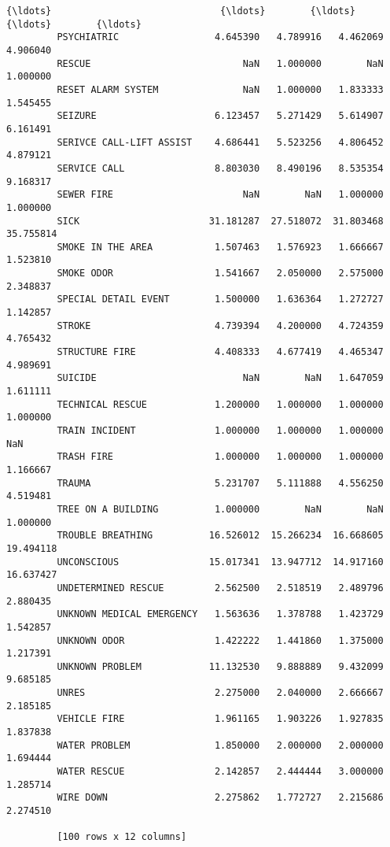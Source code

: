 \documentclass[11pt]{article}
\begin{document}
\begin{Verbatim}[commandchars=\\\{\}]
         {\ldots}                              {\ldots}        {\ldots}        {\ldots}        {\ldots}  
         PSYCHIATRIC                 4.645390   4.789916   4.462069   4.906040  
         RESCUE                           NaN   1.000000        NaN   1.000000  
         RESET ALARM SYSTEM               NaN   1.000000   1.833333   1.545455  
         SEIZURE                     6.123457   5.271429   5.614907   6.161491  
         SERIVCE CALL-LIFT ASSIST    4.686441   5.523256   4.806452   4.879121  
         SERVICE CALL                8.803030   8.490196   8.535354   9.168317  
         SEWER FIRE                       NaN        NaN   1.000000   1.000000  
         SICK                       31.181287  27.518072  31.803468  35.755814  
         SMOKE IN THE AREA           1.507463   1.576923   1.666667   1.523810  
         SMOKE ODOR                  1.541667   2.050000   2.575000   2.348837  
         SPECIAL DETAIL EVENT        1.500000   1.636364   1.272727   1.142857  
         STROKE                      4.739394   4.200000   4.724359   4.765432  
         STRUCTURE FIRE              4.408333   4.677419   4.465347   4.989691  
         SUICIDE                          NaN        NaN   1.647059   1.611111  
         TECHNICAL RESCUE            1.200000   1.000000   1.000000   1.000000  
         TRAIN INCIDENT              1.000000   1.000000   1.000000        NaN  
         TRASH FIRE                  1.000000   1.000000   1.000000   1.166667  
         TRAUMA                      5.231707   5.111888   4.556250   4.519481  
         TREE ON A BUILDING          1.000000        NaN        NaN   1.000000  
         TROUBLE BREATHING          16.526012  15.266234  16.668605  19.494118  
         UNCONSCIOUS                15.017341  13.947712  14.917160  16.637427  
         UNDETERMINED RESCUE         2.562500   2.518519   2.489796   2.880435  
         UNKNOWN MEDICAL EMERGENCY   1.563636   1.378788   1.423729   1.542857  
         UNKNOWN ODOR                1.422222   1.441860   1.375000   1.217391  
         UNKNOWN PROBLEM            11.132530   9.888889   9.432099   9.685185  
         UNRES                       2.275000   2.040000   2.666667   2.185185  
         VEHICLE FIRE                1.961165   1.903226   1.927835   1.837838  
         WATER PROBLEM               1.850000   2.000000   2.000000   1.694444  
         WATER RESCUE                2.142857   2.444444   3.000000   1.285714  
         WIRE DOWN                   2.275862   1.772727   2.215686   2.274510  
         
         [100 rows x 12 columns]
\end{Verbatim}
            
\end{document}
